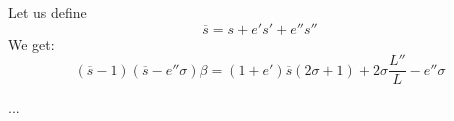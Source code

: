 \documentclass{article}
\begin{document}
Let us define
\begin{equation}
\overline{s} = s + e's' + e''s''
\end{equation}
We get:
\begin{equation}
(\overline{s} - 1)(\overline{s} - e''\sigma)\beta
= (1 + e')\overline{s}(2\sigma + 1) + 2\sigma \frac{L''}{L}
  - e''\sigma
\end{equation}

...
\end{document}
